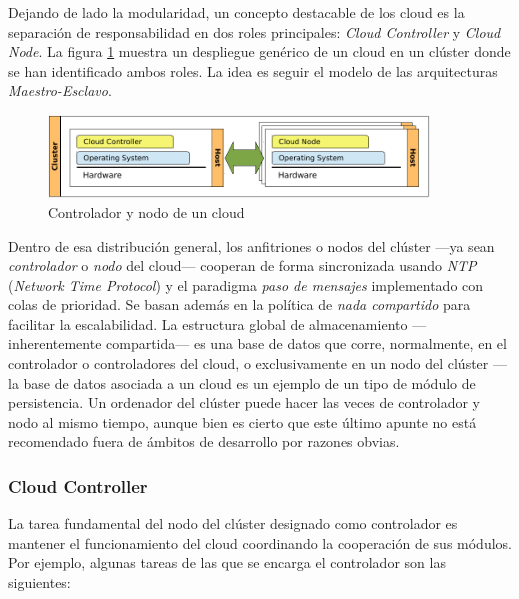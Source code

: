 Dejando de lado la modularidad, un concepto destacable de los cloud es la separaci\'on de responsabilidad en dos roles principales: \emph{Cloud Controller} y \emph{Cloud Node}. La figura \ref{fig:archcloud} muestra un despliegue gen\'erico de un cloud en un cl\'uster donde se han identificado ambos roles. La idea es seguir el modelo de las arquitecturas \emph{Maestro-Esclavo}.\newline

\begin{figure}[tbp]
\begin{center}
\includegraphics[width=0.9\textwidth]{imagenes/004.pdf}
 \caption{Controlador y nodo de un cloud}
\label{fig:archcloud}
\end{center}
\end{figure}

Dentro de esa distribuci\'on general, los anfitriones o nodos del cl\'uster ---ya sean \emph{controlador} o \emph{nodo} del cloud--- cooperan de forma sincronizada usando \emph{NTP} (\emph{Network Time Protocol}) y el paradigma \emph{paso de mensajes} implementado con colas de prioridad. Se basan adem\'as en la pol\'itica de \emph{nada compartido} para facilitar la escalabilidad. La estructura global de almacenamiento ---inherentemente compartida--- es una base de datos que corre, normalmente, en el controlador o controladores del cloud, o exclusivamente en un nodo del cl\'uster ---la base de datos asociada a un cloud es un ejemplo de un tipo de m\'odulo de persistencia. Un ordenador del cl\'uster puede hacer las veces de controlador y nodo al mismo tiempo, aunque bien es cierto que este \'ultimo apunte no est\'a recomendado fuera de \'ambitos de desarrollo por razones obvias.


\subsubsection{Cloud Controller}\label{subsubsec:cloudcontroller}
\noindent La tarea fundamental del nodo del cl\'uster designado como controlador es mantener el funcionamiento del cloud coordinando la cooperaci\'on de sus m\'odulos. Por ejemplo, algunas tareas de las que se encarga el controlador son las siguientes:

